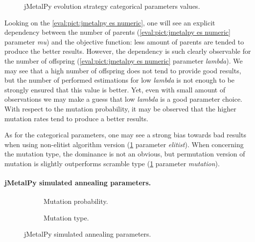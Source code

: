 \begin{figure}[h!]
	\centering
	\vspace{-20pt}
	
	\caption{jMetalPy evolution strategy categorical parameters values.}
	\label{eval:pict:jmetalpy es categoric}
	\vspace{-20pt}
\end{figure}

Looking on the \cref{eval:pict:jmetalpy es numeric}, one will see an explicit dependency between the number of parents (\cref{eval:pict:jmetalpy es numeric} parameter \emph{mu}) and the objective function: less amount of parents are tended to produce the better results. However, the dependency is such clearly observable for the number of offspring (\cref{eval:pict:jmetalpy es numeric} parameter \emph{lambda}). We may see that a high number of offspring does not tend to provide good results, but the number of performed estimations for low \emph{lambda} is not enough to be strongly ensured that this value is better. Yet, even with small amount of observations we may make a guess that low \emph{lambda} is a good parameter choice. With respect to the mutation probability, it may be observed that the higher mutation rates tend to produce a better results. 

As for the categorical parameters, one may see a strong bias towards bad results when using non-elitist algorithm version (\cref{eval:pict:jmetalpy es categoric} parameter \emph{elitist}). When concerning the mutation type, the dominance is not an obvious, but permutation version of mutation is slightly outperforms scramble type (\cref{eval:pict:jmetalpy es categoric} parameter \emph{mutation}).


\paragraph{jMetalPy simulated annealing parameters.}
\begin{figure}[h]
	\centering
	\begin{subfigure}{0.35\textwidth}
		\vspace{-10pt}
		
		\caption{Mutation probability.}
		\label{eval:pict:jmetalpy sa numeric}
	\end{subfigure}
	\hfil 
	\begin{subfigure}{0.4\textwidth}
		
		\vspace{-5pt}
		\caption{Mutation type.}
		\label{eval:pict:jmetalpy sa categoric}
	\end{subfigure}
	\caption{jMetalPy simulated annealing parameters.}
\end{figure}


